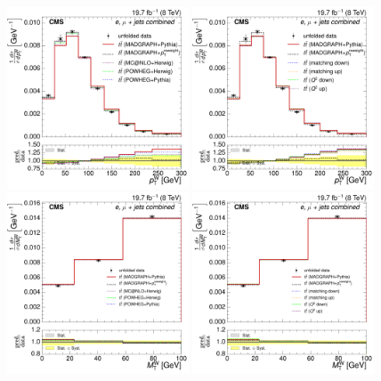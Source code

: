 \begin{figure}[hbtp]
    \centering
     \includegraphics[width=0.48\textwidth]{Chapters/04_Analysis/04b_XSections/images/results/fit/8TeV/WPT/central/normalised_xsection_combined_different_generators.pdf}\hfill
     \includegraphics[width=0.48\textwidth]{Chapters/04_Analysis/04b_XSections/images/results/fit/8TeV/WPT/central/normalised_xsection_combined_systematics_shifts.pdf}\\
     \includegraphics[width=0.48\textwidth]{Chapters/04_Analysis/04b_XSections/images/results/fit/8TeV/MT/central/normalised_xsection_combined_different_generators.pdf}\hfill
     \includegraphics[width=0.48\textwidth]{Chapters/04_Analysis/04b_XSections/images/results/fit/8TeV/MT/central/normalised_xsection_combined_systematics_shifts.pdf}\\

\end{figure}

